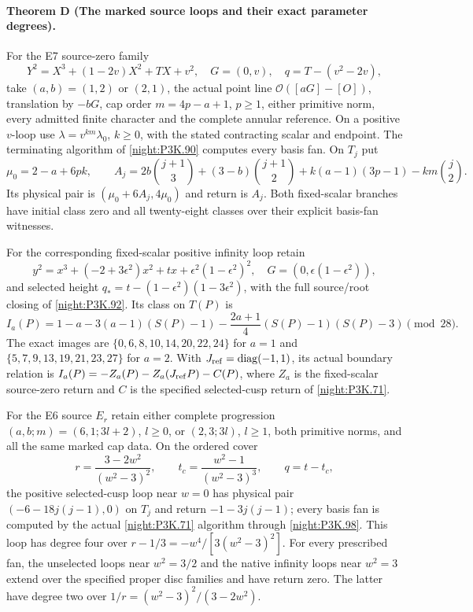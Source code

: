 \paragraph{Theorem D (The marked source loops and their exact parameter degrees).}
\label{series:IV:D}
For the E7 source-zero family
\[
 Y^2=X^3+(1-2v)X^2+TX+v^2,\quad G=(0,v),\quad q=T-(v^2-2v),
\]
take $(a,b)=(1,2)$ or $(2,1)$, the actual point line
$\mathcal O([aG]-[O])$, translation by $-bG$, cap order
$m=4p-a+1$, $p\ge1$, either primitive norm, every admitted
finite character and the complete annular reference. On a positive
$v$-loop use $\lambda=v^{km}\lambda_0$, $k\ge0$, with the stated
contracting scalar and endpoint. The terminating algorithm of
\cref{night:P3K.90} computes every basis fan. On $T_j$ put
\[
 \mu_0=2-a+6pk,\qquad
 A_j=2b\binom{j+1}{3}+(3-b)\binom{j+1}{2}
       +k(a-1)(3p-1)-km\binom j2.
\]
Its physical pair is $(\mu_0+6A_j,4\mu_0)$ and return is $A_j$.
Both fixed-scalar branches have initial class zero and all
twenty-eight classes over their explicit basis-fan witnesses.

For the corresponding fixed-scalar positive infinity loop retain
\[
 y^2=x^3+(-2+3\epsilon^2)x^2+tx+\epsilon^2(1-\epsilon^2)^2,
 \quad G=(0,\epsilon(1-\epsilon^2)),
\]
and selected height $q_*=t-(1-\epsilon^2)(1-3\epsilon^2)$,
with the full source/root closing of \cref{night:P3K.92}.
Its class on $T(P)$ is
\[
 I_a(P)=1-a-3(a-1)(S(P)-1)
        -\frac{2a+1}{4}(S(P)-1)(S(P)-3)\pmod{28}.
\]
The exact images are
$\{0,6,8,10,14,20,22,24\}$ for $a=1$ and
$\{5,7,9,13,19,21,23,27\}$ for $a=2$.
With $J_{\rm ref}=\operatorname{diag}(-1,1)$, its actual boundary
relation is $I_a(P)=-Z_a(P)-Z_a(J_{\rm ref}P)-C(P)$, where
$Z_a$ is the fixed-scalar source-zero return and $C$ is the
specified selected-cusp return of \cref{night:P3K.71}.

For the E6 source $E_r$ retain either complete progression
$(a,b;m)=(6,1;3l+2)$, $l\ge0$, or $(2,3;3l)$, $l\ge1$,
both primitive norms, and all the same marked cap data.
On the ordered cover
\[
 r=\frac{3-2w^2}{(w^2-3)^2},\qquad
 t_c=\frac{w^2-1}{(w^2-3)^3},\qquad q=t-t_c,
\]
the positive selected-cusp loop near $w=0$ has physical pair
$(-6-18j(j-1),0)$ on $T_j$ and return $-1-3j(j-1)$;
every basis fan is computed by the actual \cref{night:P3K.71}
algorithm through \cref{night:P3K.98}. This loop has degree four
over $r-1/3=-w^4/[3(w^2-3)^2]$.
For every prescribed fan, the unselected loops near $w^2=3/2$
and the native infinity loops near $w^2=3$ extend over the
specified proper disc families and have return zero. The latter
have degree two over $1/r=(w^2-3)^2/(3-2w^2)$.


